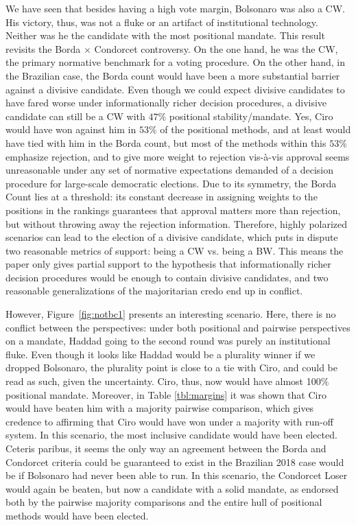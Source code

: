 \documentclass[hidelinks,11pt]{article} \usepackage[utf8]{inputenc}
\begin{document}
    We have seen that besides having a high vote margin, Bolsonaro was also
    a CW. His victory, thus, was not a fluke or an artifact of institutional
    technology. Neither was he the candidate with the most positional mandate.
    This result revisits the Borda \(\times\) Condorcet controversy. On the one
    hand, he was the CW, the primary normative benchmark for a voting procedure.
    On the other hand, in the Brazilian case, the Borda count would have been a
    more substantial barrier against a divisive candidate. Even though we could
    expect divisive candidates to have fared worse under informationally richer
    decision procedures, a divisive candidate can still be a CW with \(47\%\)
    positional stability/mandate. Yes, Ciro would have won against him in
    \(53\%\) of the positional methods, and at least would have tied with him in
    the Borda count, but most of the methods within this \(53\%\) emphasize
    rejection, and to give more weight to rejection vis-\`a-vis approval seems
    unreasonable under any set of normative expectations demanded of a decision
    procedure for large-scale democratic elections. Due to its symmetry, the
    Borda Count lies at a threshold: its constant decrease in assigning weights
    to the positions in the rankings guarantees that approval matters more than
    rejection, but without throwing away the rejection information. Therefore,
    highly polarized scenarios can lead to the election of a divisive candidate,
    which puts in dispute two reasonable metrics of support: being a CW vs.
    being a BW. This means the paper only gives partial support to the
    hypothesis that informationally richer decision procedures would be enough
    to contain divisive candidates, and two reasonable generalizations of the
    majoritarian credo end up in conflict.

    However, Figure~\ref{fig:notbc1} presents an interesting scenario. Here,
there is no conflict between the perspectives: under both positional and
pairwise perspectives on a mandate, Haddad going to the second round was purely
an institutional fluke. Even though it looks like Haddad would be a plurality
winner if we dropped Bolsonaro, the plurality point is close to a tie with Ciro,
and could be read as such, given the uncertainty. Ciro, thus, now would have
almost 100\(\%\) positional mandate. Moreover, in Table \ref{tbl:margins} it was
shown that Ciro would have beaten him with a majority pairwise comparison, which
gives credence to affirming that Ciro would have won under a majority with
run-off system. In this scenario, the most inclusive candidate would have been
elected. Ceteris paribus, it seems the only way an agreement between the
Borda and Condorcet criteria could be guaranteed to exist in the Brazilian 2018
case would be if Bolsonaro had never been able to run. In this scenario, the
Condorcet Loser would again be beaten, but now a candidate with a solid mandate,
as endorsed both by the pairwise majority comparisons and the entire hull of
positional methods would have been elected.
\end{document}
